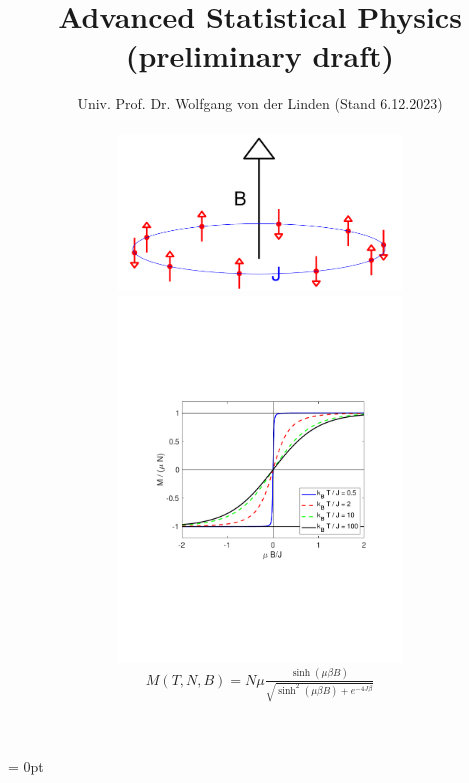 \documentclass[12pt,openany]{book}
\begin{document}
\title{Advanced Statistical Physics\\(preliminary draft)}
\author{Univ. Prof. Dr. Wolfgang von der Linden
\hfill(Stand 6.12.2023)\\
\hline\\[1.5cm]
\includegraphics[width=7.5cm]{ising_spins}
 \includegraphics[width=7.5cm]{ising}\\[1.5cm]
$M(T,N,B) = N \mu \frac{\sinh(\mu \beta B)}{\sqrt{\sinh^{2}(\mu\beta B) + e^{-4 J \beta}}}$
\\[2.5cm]}
\parindent = 0pt
\maketitle
\newpage
\setcounter{page}{1}
\tableofcontents

%
%
%
%
	

	 
	   



\end{document}
